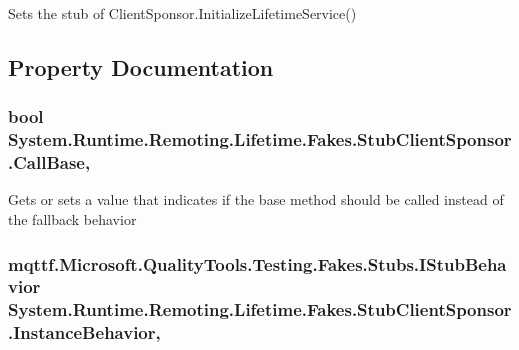 Sets the stub of Client\-Sponsor.\-Initialize\-Lifetime\-Service()



\subsection{Property Documentation}
\hypertarget{class_system_1_1_runtime_1_1_remoting_1_1_lifetime_1_1_fakes_1_1_stub_client_sponsor_a532f5225a9cfd67d4473d48606214ab8}{
\subsubsection[{Call\-Base}]{\setlength{\rightskip}{0pt plus 5cm}bool System.\-Runtime.\-Remoting.\-Lifetime.\-Fakes.\-Stub\-Client\-Sponsor.\-Call\-Base\hspace{0.3cm}{\ttfamily [get]}, {\ttfamily [set]}}}\label{class_system_1_1_runtime_1_1_remoting_1_1_lifetime_1_1_fakes_1_1_stub_client_sponsor_a532f5225a9cfd67d4473d48606214ab8}


Gets or sets a value that indicates if the base method should be called instead of the fallback behavior

\hypertarget{class_system_1_1_runtime_1_1_remoting_1_1_lifetime_1_1_fakes_1_1_stub_client_sponsor_a9e90a81c576799d231cf882cb3203617}{
\subsubsection[{Instance\-Behavior}]{\setlength{\rightskip}{0pt plus 5cm}mqttf.\-Microsoft.\-Quality\-Tools.\-Testing.\-Fakes.\-Stubs.\-I\-Stub\-Behavior System.\-Runtime.\-Remoting.\-Lifetime.\-Fakes.\-Stub\-Client\-Sponsor.\-Instance\-Behavior\hspace{0.3cm}{\ttfamily [get]}, {\ttfamily [set]}}}\label{class_system_1_1_runtime_1_1_remoting_1_1_lifetime_1_1_fakes_1_1_stub_client_sponsor_a9e90a81c576799d231cf882cb3203617}


